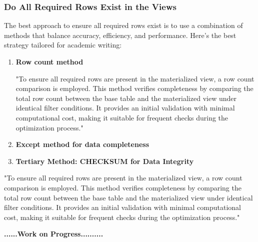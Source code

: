 \subsubsection{Do All Required Rows Exist in the Views }

 The best approach to ensure all required rows exist is to use a combination of methods that balance accuracy, efficiency, and performance. Here's the best strategy tailored for academic writing:
\begin{enumerate}
    \item \textbf{Row count method}

    
    "To ensure all required rows are present in the materialized view, a row count comparison is employed. This method verifies completeness by comparing the total row count between the base table and the materialized view under identical filter conditions. It provides an initial validation with minimal computational cost, making it suitable for frequent checks during the optimization process."
    
    \item \textbf{Except method for data completeness}

    
    \item \textbf{Tertiary Method: CHECKSUM for Data Integrity}

    
\end{enumerate}
 
"To ensure all required rows are present in the materialized view, a row count comparison is employed. This method verifies completeness by comparing the total row count between the base table and the materialized view under identical filter conditions. It provides an initial validation with minimal computational cost, making it suitable for frequent checks during the optimization process."



\textbf{......\textbf{Work on Progress}..........}       
 
